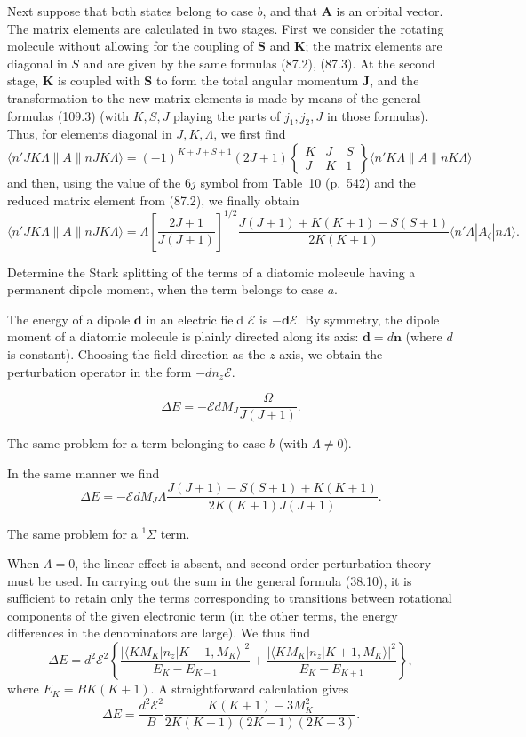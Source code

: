 Next suppose that both states belong to case $b$, and that $\mathbf A$ is an orbital vector. The matrix elements are calculated in two stages. First we consider the rotating molecule without allowing for the coupling of $\mathbf S$ and $\mathbf K$; the matrix elements are diagonal in $S$ and are given by the same formulas (87.2), (87.3). At the second stage, $\mathbf K$ is coupled with $\mathbf S$ to form the total angular momentum $\mathbf J$, and the transformation to the new matrix elements is made by means of the general formulas (109.3) (with $K,S,J$ playing the parts of $j_1,j_2,J$ in those formulas). Thus, for elements diagonal in $J,K,\Lambda$, we first find
\[
\langle n'JK\Lambda\|A\|nJK\Lambda\rangle
=(-1)^{K+J+S+1}(2J+1)
\begin{Bmatrix}K&J&S\\J&K&1\end{Bmatrix}
\langle n'K\Lambda\|A\|nK\Lambda\rangle
\]
and then, using the value of the $6j$ symbol from Table~10 (p.~542) and the reduced matrix element from (87.2), we finally obtain
\[
\langle n'JK\Lambda\|A\|nJK\Lambda\rangle
=\Lambda\left[\frac{2J+1}{J(J+1)}\right]^{1/2}
\frac{J(J+1)+K(K+1)-S(S+1)}{2K(K+1)}
\langle n'\Lambda|A_\zeta|n\Lambda\rangle.
\]



\ProblemHeading[1] Determine the Stark splitting of the terms of a diatomic molecule having a permanent dipole moment, when the term belongs to case $a$.

\SolutionHeading The energy of a dipole $\mathbf d$ in an electric field $\boldsymbol{\mathcal E}$ is $-\mathbf d\boldsymbol{\mathcal E}$. By symmetry, the dipole moment of a diatomic molecule is plainly directed along its axis: $\mathbf d=d\mathbf n$ (where $d$ is constant). Choosing the field direction as the $z$ axis, we obtain the perturbation operator in the form $-dn_z\mathcal E$.


\[
\Delta E=-\mathcal E dM_J\frac{\Omega}{J(J+1)}.
\]

\ProblemHeading[2] The same problem for a term belonging to case $b$ (with $\Lambda\ne0$).

\SolutionHeading In the same manner we find
\[
\Delta E=-\mathcal E dM_J\Lambda\frac{J(J+1)-S(S+1)+K(K+1)}{2K(K+1)J(J+1)}.
\]

\ProblemHeading[3] The same problem for a ${}^1\Sigma$ term.

\SolutionHeading When $\Lambda=0$, the linear effect is absent, and second-order perturbation theory must be used. In carrying out the sum in the general formula (38.10), it is sufficient to retain only the terms corresponding to transitions between rotational components of the given electronic term (in the other terms, the energy differences in the denominators are large). We thus find
\[
\Delta E=d^2\mathcal E^2\left\{\frac{|\langle KM_K|n_z|K-1,M_K\rangle|^2}{E_K-E_{K-1}}+\frac{|\langle KM_K|n_z|K+1,M_K\rangle|^2}{E_K-E_{K+1}}\right\},
\]
where $E_K=BK(K+1)$. A straightforward calculation gives
\[
\Delta E=\frac{d^2\mathcal E^2}{B}\frac{K(K+1)-3M_K^2}{2K(K+1)(2K-1)(2K+3)}.
\]
